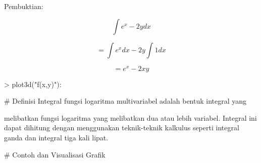 \documentclass[a4paper,10pt]{article}
\begin{document}
\begin{eulernotebook}
\begin{eulercomment}
\begin{eulercomment}
\begin{eulercomment}
\begin{eulercomment}
\begin{eulercomment}
\begin{eulercomment}
\begin{eulercomment}
\begin{eulercomment}
\begin{eulercomment}
\begin{eulercomment}
\begin{eulercomment}
\begin{eulercomment}
\begin{eulercomment}
\begin{eulercomment}
\begin{eulerformula}
\[\]
\end{eulerformula}
\begin{eulerttcomment}
   Pembuktian:
\end{eulerttcomment}
\begin{eulercomment}
\end{eulercomment}
\begin{eulerformula}
\[
\int e^x - 2y dx
\]
\end{eulerformula}
\begin{eulercomment}
\end{eulercomment}
\begin{eulerformula}
\[
= \int e^x dx - 2y \int 1 dx
\]
\end{eulerformula}
\begin{eulercomment}
\end{eulercomment}
\begin{eulerformula}
\[
= e^x - 2xy
\]
\end{eulerformula}
\begin{eulerprompt}
> plot3d("f(x,y)"):
\end{eulerprompt}
\begin{eulercomment}
\end{eulercomment}
\begin{eulercomment}
\end{eulercomment}
\begin{eulerttcomment}
 # Definisi
   Integral fungsi logaritma multivariabel adalah bentuk integral yang
\end{eulerttcomment}
\begin{eulercomment}
melibatkan fungsi logaritma yang melibatkan dua atau lebih variabel.
Integral ini dapat dihitung dengan menggunakan teknik-teknik kalkulus
seperti integral ganda dan integral tiga kali lipat. 

\end{eulercomment}
\begin{eulerttcomment}
 # Contoh dan Visualisasi Grafik
\end{eulerttcomment}
\begin{eulercomment}


\end{eulercomment}
\end{eulercomment}
\end{eulercomment}
\end{eulercomment}
\end{eulercomment}
\end{eulercomment}
\end{eulercomment}
\end{eulercomment}
\end{eulercomment}
\end{eulercomment}
\end{eulercomment}
\end{eulercomment}
\end{eulercomment}
\end{eulercomment}
\end{eulercomment}
\end{eulernotebook}
\end{document}
